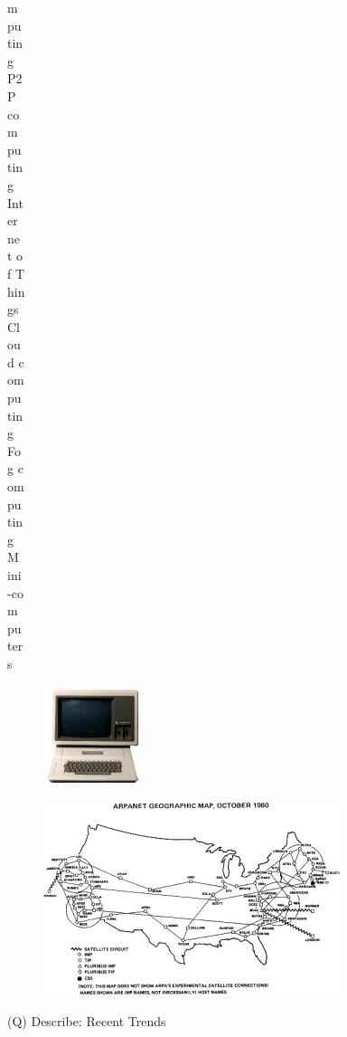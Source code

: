 \documentclass[12pt]{article}
\begin{document}
m\\
pu\\
tin\\
g\\
P2\\
P\\
co\\
m\\
pu\\
tin\\
g\\
Int\\
er\\
ne\\
t o\\
f T\\
hin\\
gs\\
Cl\\
ou\\
d c\\
om\\
pu\\
tin\\
g\\
Fo\\
g c\\
om\\
pu\\
tin\\
g\\
M\\
ini\\
-co\\
m\\
pu\\
ter\\
s\\
\begin{figure}[H]
\includegraphics[width=0.5\linewidth]{page14-image-1.png}
\end{figure}
\begin{figure}[H]
\includegraphics[width=0.5\linewidth]{page14-image-2.png}
\end{figure}
\clearpage
(Q)
Describe: Recent Trends
\clearpage
\end{document}
